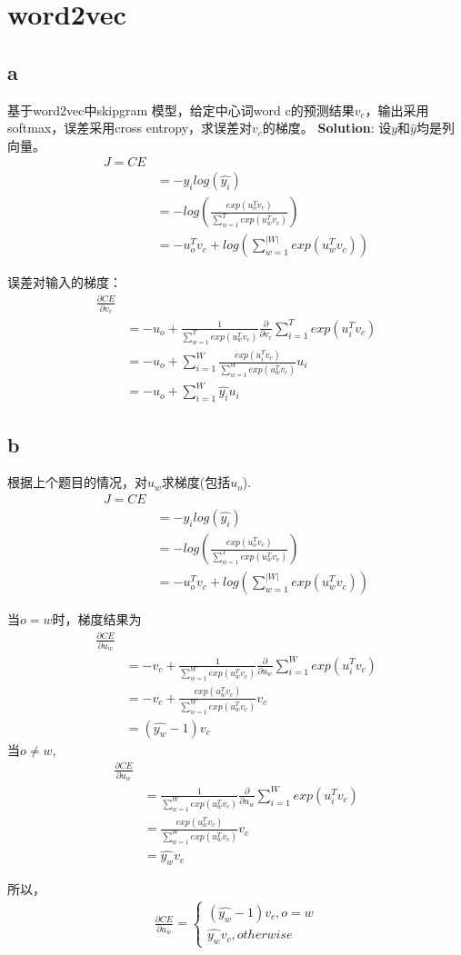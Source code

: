 \documentclass[twoside,nofonts,fancyhdr,openany,UTF8,fleqn]{ctexart} %
\begin{document}
\section{word2vec}
\subsection{a}
基于word2vec中skipgram 模型，给定中心词word c的预测结果$v_c$，输出采用softmax，误差采用cross entropy，求误差对$v_c$的梯度。
\textbf{Solution}:
设$y$和$\widehat{y}$均是列向量。
\begin{align}
J = CE \\ 
& = -{y_i}log(\widehat{y_i}) \\
& = -log(\frac{exp(u_o^Tv_c)}{\sum_{w=1}^{T}exp(u_w^Tv_c)}) \\
& = -u_o^Tv_c + log({\sum_{w=1}^{|W|}exp(u_w^Tv_c)})
\end{align}

误差对输入的梯度：
\begin{align}
\frac{\partial{CE}}{\partial{v_c}}  \\
& = -u_o + \frac{1}{\sum_{w=1}^{T}exp(u_w^Tv_c)}\frac{\partial}{\partial{v_c}}{\sum_{i=1}^{T}exp(u_i^Tv_c)} \\
& = -u_o + \sum_{i=1}^{W}\frac{exp(u_i^Tv_c)}{\sum_{w=1}^{W}exp(u_w^Tv_c)}u_i \\
& = -u_o + \sum_{i=1}^{W}\widehat{y_i}u_i
\end{align}

\subsection{b}
根据上个题目的情况，对$u_w$求梯度(包括$u_o$).
\begin{align}
J = CE \\ 
& = -{y_i}log(\widehat{y_i}) \\
& = -log(\frac{exp(u_o^Tv_c)}{\sum_{w=1}^{T}exp(u_w^Tv_c)}) \\
& = -u_o^Tv_c + log({\sum_{w=1}^{|W|}exp(u_w^Tv_c)})
\end{align}

当$o=w$时，梯度结果为
\begin{align}
\frac{\partial{CE}}{\partial{u_w}} \\
	& = -v_c + \frac{1}{\sum_{w=1}^{W}exp(u_w^Tv_c)}\frac{\partial}{\partial{u_w}}\sum_{i=1}^{W}exp(u_i^Tv_c) \\
& = -v_c + \frac{exp(u_w^Tv_c)}{\sum_{w=1}^{W}exp(u_w^Tv_c)}v_c \\
& = (\widehat{y_w}-1)v_c
\end{align}
当$o\neq{w}$,
\begin{align}
\frac{\partial{CE}}{\partial{u_w}} \\
	& = \frac{1}{\sum_{w=1}^{W}exp(u_w^Tv_c)}\frac{\partial}{\partial{u_w}}\sum_{i=1}^{W}exp(u_i^Tv_c) \\
& = \frac{exp(u_w^Tv_c)}{\sum_{w=1}^{W}exp(u_w^Tv_c)}v_c \\
& = \widehat{y_w}v_c
\end{align}

所以，
\begin{align}
\frac{\partial{CE}}{\partial{u_w}} = \left \{ 
\begin{aligned}
(\widehat{y_w}-1)v_c , o=w\\
\widehat{y_w}v_c , otherwise
\end{aligned}
\right.
\end{align}
\end{document}

